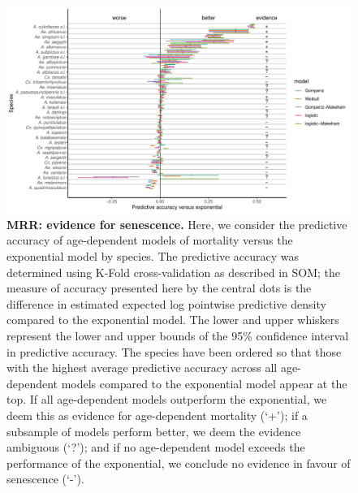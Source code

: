 \documentclass[12pt]{article}
\begin{document}
\begin{figure}[h]
	\centerline{\includegraphics[width=1.3\textwidth]{./Figure_files/mrr_elpd_vs_exponential_ordered.pdf}}
	\caption{\textbf{MRR: evidence for senescence.} Here, we consider the predictive accuracy of age-dependent models of mortality versus the exponential model by species. The predictive accuracy was determined using K-Fold cross-validation as described in SOM; the measure of accuracy presented here by the central dots is the difference in estimated expected log pointwise predictive density compared to the exponential model. The lower and upper whiskers represent the lower and upper bounds of the 95\% confidence interval in predictive accuracy. The species have been ordered so that those with the highest average predictive accuracy across all age-dependent models compared to the exponential model appear at the top. If all age-dependent models outperform the exponential, we deem this as evidence for age-dependent mortality (`+'); if a subsample of models perform better, we deem the evidence ambiguous (`?'); and if no age-dependent model exceeds the performance of the exponential, we conclude no evidence in favour of senescence (`-').}
	\label{fig:mrr_elpd}
\end{figure}
\end{document}
